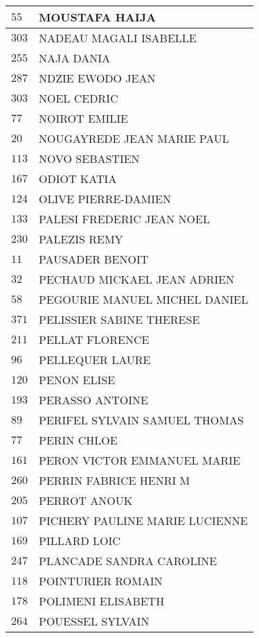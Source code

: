 \begin{xltabular}{\linewidth}{|l|X|}
    \hline
    $55$ & MOUSTAFA HAIJA \\
    \hline
    $303$ & NADEAU MAGALI ISABELLE \\
    \hline
    $255$ & NAJA DANIA \\
    \hline
    $287$ & NDZIE EWODO JEAN \\
    \hline
    $303$ & NOEL CEDRIC \\
    \hline
    $77$ & NOIROT EMILIE \\
    \hline
    $20$ & NOUGAYREDE JEAN MARIE PAUL \\
    \hline
    $113$ & NOVO SEBASTIEN \\
    \hline
    $167$ & ODIOT KATIA \\
    \hline
    $124$ & OLIVE PIERRE-DAMIEN \\
    \hline
    $133$ & PALESI FREDERIC JEAN NOEL \\
    \hline
    $230$ & PALEZIS REMY \\
    \hline
    $11$ & PAUSADER BENOIT \\
    \hline
    $32$ & PECHAUD MICKAEL JEAN ADRIEN \\
    \hline
    $58$ & PEGOURIE MANUEL MICHEL DANIEL \\
    \hline
    $371$ & PELISSIER SABINE THERESE \\
    \hline
    $211$ & PELLAT FLORENCE \\
    \hline
    $96$ & PELLEQUER LAURE \\
    \hline
    $120$ & PENON ELISE \\
    \hline
    $193$ & PERASSO ANTOINE \\
    \hline
    $89$ & PERIFEL SYLVAIN SAMUEL THOMAS \\
    \hline
    $77$ & PERIN CHLOE \\
    \hline
    $161$ & PERON VICTOR EMMANUEL MARIE \\
    \hline
    $260$ & PERRIN FABRICE HENRI M \\
    \hline
    $205$ & PERROT ANOUK \\
    \hline
    $107$ & PICHERY PAULINE MARIE LUCIENNE \\
    \hline
    $169$ & PILLARD LOIC \\
    \hline
    $247$ & PLANCADE SANDRA CAROLINE \\
    \hline
    $118$ & POINTURIER ROMAIN \\
    \hline
    $178$ & POLIMENI ELISABETH \\
    \hline
    $264$ & POUESSEL SYLVAIN \\

\end{xltabular}
